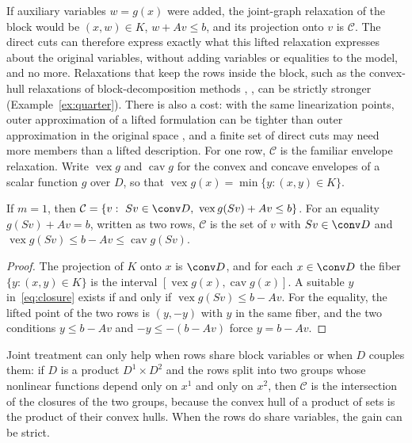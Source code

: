 If auxiliary variables $w=g(x)$ were added, the joint-graph relaxation of the
block would be $(x,w)\in K$, $w+Av\le b$, and its projection onto $v$ is
$\mathcal C$. The direct cuts can therefore express exactly what this lifted
relaxation expresses about the original variables, without adding variables
or equalities to the model, and no more. Relaxations that keep the rows
inside the block, such as the convex-hull relaxations of block-decomposition
methods \citep[Section~3]{Nowak2005}, \citep{WuMutsNowakHendrix2025}, can be
strictly stronger (Example~\ref{ex:quarter}). There is also a cost: with the
same linearization points, outer approximation of a lifted formulation can be
tighter than outer approximation in the original space
\citep{TawarmalaniSahinidis2005}, and a finite set of direct cuts may need
more members than a lifted description. For one row, $\mathcal C$ is the
familiar envelope relaxation. Write $\operatorname{vex}g$ and
$\operatorname{cav}g$ for the convex and concave envelopes of a scalar
function $g$ over $D$, so that $\operatorname{vex}g(x)=\min\{y:(x,y)\in K\}$.

\begin{corollary}\label{cor:one-row}
If $m=1$, then $\mathcal C=\{v:\ Sv\in\conv D,\ \operatorname{vex}g(Sv)+Av\le b\}$.
For an equality $g(Sv)+Av=b$, written as two rows, $\mathcal C$ is the set of
$v$ with $Sv\in\conv D$ and
$\operatorname{vex}g(Sv)\le b-Av\le\operatorname{cav}g(Sv)$.
\end{corollary}

\begin{proof}
The projection of $K$ onto $x$ is $\conv D$, and for each $x\in\conv D$ the
fiber $\{y:(x,y)\in K\}$ is the interval
$[\operatorname{vex}g(x),\operatorname{cav}g(x)]$. A suitable $y$
in~\eqref{eq:closure} exists if and only if $\operatorname{vex}g(Sv)\le b-Av$.
For the equality, the lifted point of the two rows is $(y,-y)$ with $y$ in the
same fiber, and the two conditions $y\le b-Av$ and $-y\le-(b-Av)$ force
$y=b-Av$.
\end{proof}

Joint treatment can only help when rows share block variables or when $D$
couples them: if $D$ is a product $D^1\times D^2$ and the rows split into two
groups whose nonlinear functions depend only on $x^1$ and only on $x^2$, then
$\mathcal C$ is the intersection of the closures of the two groups, because the
convex hull of a product of sets is the product of their convex hulls.
When the rows do share variables, the gain can be strict.

